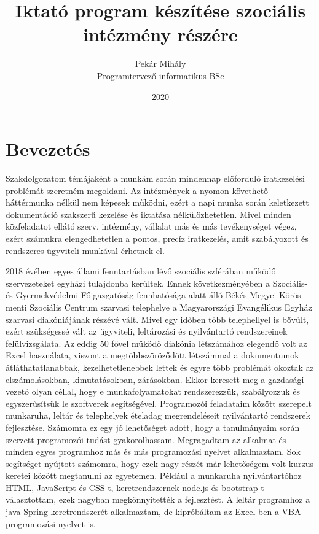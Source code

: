 \documentclass[
]{thesis-ekf}
\theoremstyle{definition}
\theoremstyle{remark}
\begin{document}
\title{Iktató program készítése szociális intézmény részére}
\author{Pekár Mihály\\Programtervező informatikus BSc}
\date{2020}
\maketitle
\tableofcontents
\chapter{Bevezetés}

Szakdolgozatom témájaként a munkám során mindennap előforduló iratkezelési problémát szeretném megoldani. Az intézmények a nyomon követhető háttérmunka nélkül nem képesek működni, ezért a napi munka során keletkezett dokumentáció szakszerű kezelése és iktatása nélkülözhetetlen. Mivel minden közfeladatot ellátó szerv, intézmény, vállalat más és más tevékenységet végez, ezért számukra elengedhetetlen a pontos, precíz iratkezelés, amit szabályozott és rendszeres ügyviteli munkával érhetnek el.

2018 évében egyes állami fenntartásban lévő szociális szférában működő szervezeteket egyházi tulajdonba kerültek. Ennek következményében a Szociális- és Gyermekvédelmi Főigazgatóság fennhatósága alatt álló Békés Megyei Körös-menti Szociális Centrum szarvasi telephelye a Magyarországi Evangélikus Egyház szarvasi diakóniájának részévé vált. Mivel egy időben több telephellyel is bővült, ezért szükségessé vált az ügyviteli, leltározási és nyilvántartó rendszereinek felülvizsgálata. Az eddig 50 fővel működő diakónia létszámához elegendő volt az Excel használata, viszont a megtöbbszöröződött létszámmal a dokumentumok átláthatatlanabbak, kezelhetetlenebbek lettek és egyre több problémát okoztak az elszámolásokban, kimutatásokban, zárásokban. Ekkor keresett meg a gazdasági vezető olyan céllal, hogy e munkafolyamatokat rendszerezzük, szabályozzuk és egyszerűsítsük le szoftverek segítségével. Programozói feladataim között szerepelt munkaruha, leltár és telephelyek ételadag megrendeléseit nyilvántartó rendszerek fejlesztése. Számomra ez egy jó lehetőséget adott, hogy a tanulmányaim során szerzett programozói tudást gyakorolhassam. Megragadtam az alkalmat és minden egyes programhoz más és más programozási nyelvet alkalmaztam. Sok segítséget nyújtott számomra, hogy ezek nagy részét már lehetőségem volt kurzus keretei között megtanulni az egyetemen. Például a munkaruha nyilvántartóhoz HTML, JavaScript és CSS-t, keretrendszernek node.js és bootstrap-t választottam, ezek nagyban megkönnyítették a fejlesztést. A leltár programhoz a java Spring-keretrendszerét alkalmaztam, de kipróbáltam az Excel-ben a VBA programozási nyelvet is.
\end{document}
